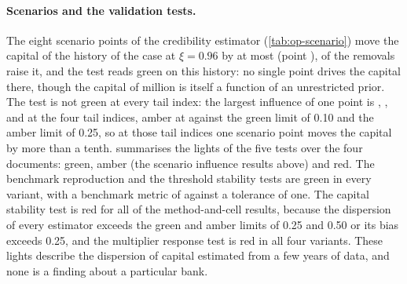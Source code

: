 \paragraph{Scenarios and the validation tests.} The eight scenario points of the credibility estimator (\cref{tab:op-scenario}) move the capital of the history of the case at $\xi=0.96$ by at most \opScMaxInf{} (point \opScMaxId{}), \opScNeg{} of the \opScNPoints{} removals raise it, and the test reads green on this history:
no single point drives the capital there, though the capital of \opScBase{} million is itself a function of an unrestricted prior. The test is not green at every tail index: the largest influence of one point is \opScTestA{}, \opScTestB{}, \opScTestC{} and \opScTestD{} at the four tail indices, amber at \opScAmberWhich{} against the green limit of 0.10 and the amber limit of 0.25, so at those tail indices one scenario point moves the capital by more than a tenth.  summarises the \opTestsTotal{} lights of the five tests over the four documents: \opTestsGreen{} green, \opTestsAmber{} amber (the \opScAmberN{} scenario influence results above) and \opTestsRed{} red. The benchmark reproduction and the
threshold stability tests are green in every variant, with a benchmark metric of \opBenchStat{} against a tolerance of one. The capital stability test is red for all \opCapRed{} of the \opCapTests{} method-and-cell results, because the dispersion of every estimator exceeds the
green and amber limits of 0.25 and 0.50 or its bias exceeds 0.25, and the multiplier response test is red in all four variants. These lights describe the dispersion of capital estimated from a few years of data, and none is a finding about a particular bank.




